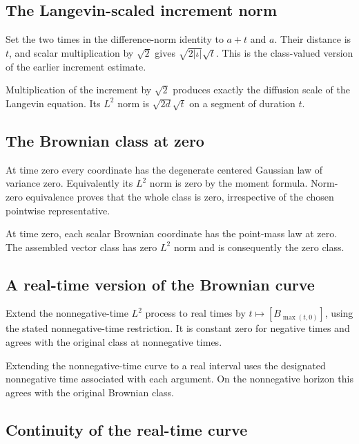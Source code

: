 \documentclass[11pt,a4paper]{article}
\begin{document}
\subsection{\texorpdfstring{The Langevin-scaled increment norm}{The Langevin-scaled increment norm}}


Set the two times in the difference-norm identity to \(a+t\) and \(a\). Their distance is \(t\), and scalar multiplication by \(\sqrt2\) gives \(\sqrt{2|\iota|}\sqrt t\). This is the class-valued version of the earlier increment estimate.



Multiplication of the increment by \(\sqrt2\) produces exactly the diffusion scale of the Langevin equation. Its \(L^2\) norm is \(\sqrt{2d}\sqrt t\) on a segment of duration \(t\).


\subsection{\texorpdfstring{The Brownian class at zero}{The Brownian class at zero}}


At time zero every coordinate has the degenerate centered Gaussian law of variance zero. Equivalently its \(L^2\) norm is zero by the moment formula. Norm-zero equivalence proves that the whole class is zero, irrespective of the chosen pointwise representative.



At time zero, each scalar Brownian coordinate has the point-mass law at zero. The assembled vector class has zero \(L^2\) norm and is consequently the zero class.


\subsection{\texorpdfstring{A real-time version of the Brownian curve}{A real-time version of the Brownian curve}}


Extend the nonnegative-time \(L^2\) process to real times by \(t\mapsto[B_{\max(t,0)}]\), using the stated nonnegative-time restriction. It is constant zero for negative times and agrees with the original class at nonnegative times.



Extending the nonnegative-time curve to a real interval uses the designated nonnegative time associated with each argument. On the nonnegative horizon this agrees with the original Brownian class.


\subsection{\texorpdfstring{Continuity of the real-time curve}{Continuity of the real-time curve}}
\end{document}
